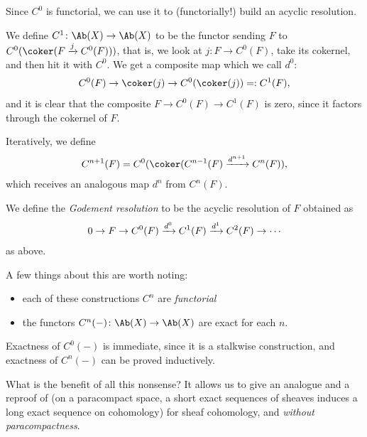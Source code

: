 \documentclass[11pt]{book}
\begin{document}
Since $C^0$ is functorial, we can use it to (functorially!) build an acyclic resolution.

\begin{notation} We define $C^1 \colon \Ab(X) \to \Ab(X)$ to be the functor sending $F$ to $C^0(\coker(F \xto{j}C^0(F)))$, that is, we look at $j \colon F \to C^0(F)$, take its cokernel, and then hit it with $C^0$. We get a composite map which we call $d^0$:
\begin{align*}
    C^0(F) \to \coker(j) \to C^0(\coker(j)) =: C^1(F),
\end{align*}
and it is clear that the composite $F \to C^0(F) \to C^1(F)$ is zero, since it factors through the cokernel of $F$.

Iteratively, we define
\begin{align*}
    C^{n+1}(F) = C^0(\coker(C^{n-1}(F) \xto{d^{n+1}} C^n(F)),
\end{align*}
which receives an analogous map $d^n$ from $C^n(F)$.
\end{notation}

\begin{definition}\label{def:godement-resolution} 
We define the \textit{Godement resolution} to be the acyclic resolution of $F$ obtained as
\begin{align*}
    0 \to F \to C^0(F) \xrightarrow{d^0} C^1(F) \xrightarrow{d^1} C^2(F) \to \cdots 
\end{align*}
as above.
\end{definition}

\begin{remark} A few things about this are worth noting:
\begin{itemize}
    \item each of these constructions $C^n$ are \emph{functorial}
    \item the functors $C^n(-) \colon \Ab(X) \to \Ab(X)$ are exact for each $n$.
\end{itemize}
Exactness of $C^0(-)$ is immediate, since it is a stalkwise construction, and exactness of $C^n(-)$ can be proved inductively.
\end{remark}

What is the benefit of all this nonsense? It allows us to give an analogue and a reproof of  (on a paracompact space, a short exact sequences of sheaves induces a long exact sequence on cohomology) for sheaf cohomology, and \emph{without paracompactness}.
\end{document}
